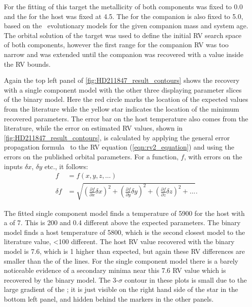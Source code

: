 For the fitting of this target the metallicity of both components was fixed to 0.0 and the \Logg{} for the host was fixed at 4.5.
The \Logg{} for the companion is also fixed to 5.0, based on the~\citet{baraffe_new_2015} evolutionary models for the given companion mass and system age.
The orbital solution of the target was used to define the initial {RV} search space of both components, however the first range for the companion {RV} was too narrow and was extended until the companion was recovered with a value inside the {RV} bounds.

Again the top left panel of \cref{fig:HD211847_result_contours} shows the recovery with a single component model with the other three displaying parameter slices of the binary model.
Here the red circle marks the location of the expected values from the literature while the yellow star indicates the location of the minimum \textchisquared{} recovered parameters.
The error bar on the host temperature also comes from the literature, while the error on estimated {RV} values, shown in \cref{fig:HD211847_result_contours}, is calculated by applying the general error propagation formula~\citep{ku_notes_1966} to the {RV} equation (\cref{eqn:rv2_equation}) and using the errors on the published orbital parameters.
For a function, \(f\), with errors on the inputs \(\delta x\), \(\delta y\) etc., it follows:
\begin{align}
f &= f(x, y, z, \ldots)\\
\delta f &= \sqrt{{\left( \frac{\partial f}{\partial x} \delta x\right)}^2 + {\left(\frac{\partial f}{\partial y} \delta y\right)}^2 + {\left(\frac{\partial f}{\partial z} \delta z\right)}^2 + \ldots}.
\end{align}

The fitted single component model finds a temperature of 5900\K{} for the host with a \Rvone{} of 7\kmps{}.
This is 200\K{} and 0.4\kmps{} different above the expected parameters.
The binary model finds a host temperature of 5800\K{}, which is the second closest model to the literature value, <100\K{} different.
The host {RV} value recovered with the binary model is 7.6\kmps{}, which is 1\kmps{} higher than expected, but again these {RV} differences are smaller than the {\fwhm} of the lines.
For the single component model there is a barely noticeable evidence of a secondary minima near this 7.6\kmps{} {RV} value which is recovered by the binary model.
The 3-\(\sigma\) contour in these plots is small due to the large gradient of the \textchisquared{}; it is just visible on the right hand side of the star in the bottom left panel, and hidden behind the markers in the other panels.

